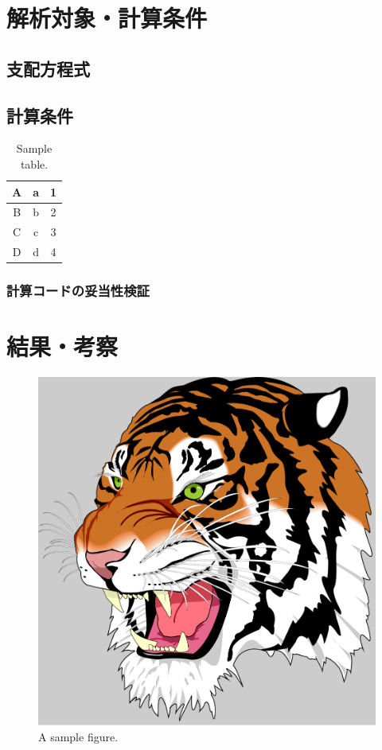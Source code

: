 \documentclass[
    paper=a4paper,      %
    article,            %
    fleqn,              %
    fontsize=10pt,      %
    jafontsize=10pt,    %
    head_space=20mm,    %
    foot_space=25mm,    %
    gutter=20mm,        %
    fore-edge=20mm      %
    ]{jlreq}            %
\begin{document}
\lipsum[1-4]

\section{解析対象・計算条件}


\subsection{支配方程式}

\subsection{計算条件}

\begin{table}[tp]
  \centering
  \caption{Sample table.}
  \label{tab:table}
  \begin{tabularx}{0.5\textwidth}{C|C|C} \hline\hline
    A  &a  &1 \\ \hline
    B  &b  &2 \\ \hline
    C  &c  &3 \\ \hline
    D  &d  &4 \\ \hline
  \end{tabularx}
\end{table}

\subsubsection{計算コードの妥当性検証}

\lipsum[1-4]


\section{結果・考察}

\begin{figure}[tp]
  \centering
  \includegraphics[width=0.5\columnwidth]{figure/tiger.pdf}
  \caption{A sample figure.}
  \label{fig:one_figure}
\end{figure}
\end{document}

